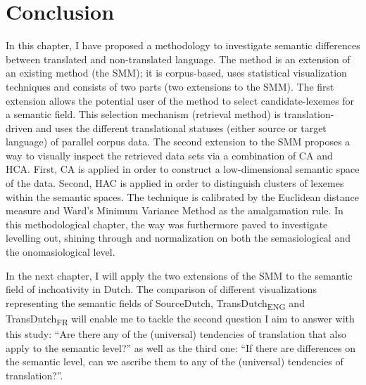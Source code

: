\section{Conclusion}
\label{sec:3.9}  
In this chapter, I have proposed a methodology to investigate semantic differences between translated and non-translated language. The method is an extension of an existing method (the SMM); it is corpus-based, uses statistical visualization techniques and consists of two parts (two extensions to the SMM). The first extension allows the potential user of the method to select candidate-lexemes for a semantic field. This selection mechanism (retrieval method) is translation-driven and uses the different translational statuses (either source or target language) of parallel corpus data. The second extension to the SMM proposes a way to visually inspect the retrieved data sets via a combination of CA and HCA. First, CA is applied in order to construct a low-dimensional semantic space of the data. Second, HAC is applied in order to distinguish clusters of lexemes within the semantic spaces. The technique is calibrated by the Euclidean distance measure and Ward’s Minimum Variance Method as the amalgamation rule. In this methodological chapter, the way was furthermore paved to investigate levelling out, shining through and normalization on both the semasiological and the onomasiological level.

In the next chapter, I will apply the two extensions of the SMM to the semantic field of inchoativity in Dutch. The comparison of different visualizations representing the semantic fields of SourceDutch, TransDutch\textsubscript{ENG} and TransDutch\textsubscript{FR} will enable me to tackle the second question I aim to answer with this study: “Are there any of the (universal) tendencies of translation that also apply to the semantic level?” as well as the third one: “If there are differences on the semantic level, can we ascribe them to any of the (universal) tendencies of translation?”.
